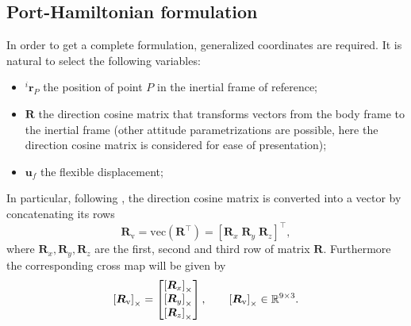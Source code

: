 \subsection{Port-Hamiltonian formulation}
In order to get a complete formulation, generalized coordinates are required. It is natural to select the following variables:
\begin{itemize}
	\item $^i \bm{r}_P$ the position of point $P$ in the inertial frame of reference;
	\item $\bm{R}$ the direction cosine matrix that transforms vectors from the body frame to the inertial frame (other attitude parametrizations are possible, here the direction cosine matrix is considered for ease of presentation);
	\item $\bm{u}_f$ the flexible displacement;
\end{itemize}

In particular, following \cite{forni2015}, the direction cosine matrix is converted into a vector by concatenating its rows
\begin{equation*}
\bm{R}_{\text{v}} = \text{vec}(\bm{R}^\top) = [\bm{R}_x \; \bm{R}_y \; \bm{R}_z]^\top,
\end{equation*}
where $\bm{R}_{x}, \bm{R}_{y}, \bm{R}_{z}$ are the first, second and third row of matrix $\bm{R}$. Furthermore the corresponding cross map will be given by
\begin{equation*}
\left[\bm{R}_{\text{v}}\right]_\times = 
\begin{bmatrix}
\left[\bm{R}_x\right]_\times \\
\left[\bm{R}_y\right]_\times \\
\left[\bm{R}_z\right]_\times \\
\end{bmatrix}, \qquad 
\left[\bm{R}_{\text{v}}\right]_\times \in \mathbb{R}^{9 \times 3}.
\end{equation*}

